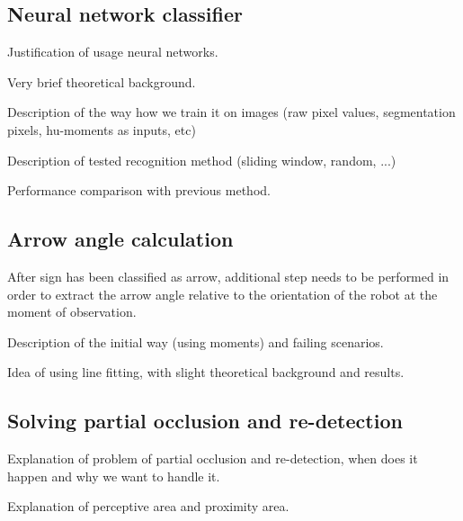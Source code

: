 \subsection{Neural network classifier}

Justification of usage neural networks.

Very brief theoretical background.

Description of the way how we train it on images (raw pixel values, segmentation pixels, hu-moments as inputs, etc)

Description of tested recognition method (sliding window, random, ...)

Performance comparison with previous method.

\subsection{Arrow angle calculation}

After sign has been classified as arrow, additional step needs to be performed in order to extract the arrow angle relative to the orientation of the robot at the moment of observation.

Description of the initial way (using moments) and failing scenarios. 

Idea of using line fitting, with slight theoretical background and results.

\subsection{Solving partial occlusion and re-detection}

Explanation of problem of partial occlusion and re-detection, when does it happen and why we want to handle it.

Explanation of perceptive area and proximity area.



